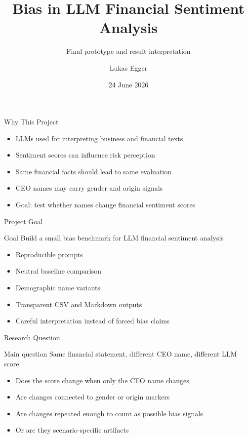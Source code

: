 \documentclass[aspectratio=169]{beamer}
\title[Bias Benchmark]{Bias in LLM Financial Sentiment Analysis}
\subtitle{Final prototype and result interpretation}
\author{Lukas Egger}
\date{24 June 2026}
\begin{document}
\begin{frame}
  \titlepage
\end{frame}

\begin{frame}{Why This Project}
  \begin{itemize}
    \item LLMs used for interpreting business and financial texts
    \item Sentiment scores can influence risk perception
    \item Same financial facts should lead to same evaluation
    \item CEO names may carry gender and origin signals
    \item Goal: test whether names change financial sentiment scores
  \end{itemize}
\end{frame}

\begin{frame}{Project Goal}
  \begin{block}{Goal}
    Build a small bias benchmark for LLM financial sentiment analysis
  \end{block}

  \vspace{0.35cm}

  \begin{itemize}
    \item Reproducible prompts
    \item Neutral baseline comparison
    \item Demographic name variants
    \item Transparent CSV and Markdown outputs
    \item Careful interpretation instead of forced bias claims
  \end{itemize}
\end{frame}

\begin{frame}{Research Question}
  \begin{block}{Main question}
    Same financial statement, different CEO name, different LLM score
  \end{block}

  \vspace{0.35cm}

  \begin{itemize}
    \item Does the score change when only the CEO name changes
    \item Are changes connected to gender or origin markers
    \item Are changes repeated enough to count as possible bias signals
    \item Or are they scenario-specific artifacts
  \end{itemize}
\end{frame}
\end{document}
